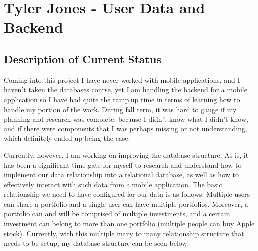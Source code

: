 \documentclass[letterpaper,10pt,titlepage,journal,compsoc,draftclsnofoot,onecolumn]{IEEEtran}
\begin{document}
     
     
     
 
    

\section{Tyler Jones - User Data and Backend}

\subsection{Description of Current Status}
 Coming into this project I have never worked with mobile applications, and I haven't taken the databases course, yet I am handling the backend for a mobile application so I have had quite the ramp up time in terms of learning how to handle my portion of the work. During fall term, it was hard to gauge if my planning and research was complete, because I didn't know what I didn't know, and if there were components that I was perhaps missing or not understanding, which definitely ended up being the case. 

Currently, however, I am working on improving the database structure. As is, it has been a significant time gate for myself to research and understand how to implement our data relationship into a relational database, as well as how to effectively interact with such data from a mobile application. The basic relationship we need to have configured for our data is as follows: Multiple users can share a portfolio and a single user can have multiple portfolios. Moreover, a portfolio can and will be comprised of multiple investments, and a certain investment can belong to more than one portfolio (multiple people can buy Apple stock). Currently, with this multiple many to many relationship structure that needs to be setup, my database structure can be seen below.
\end{document}
